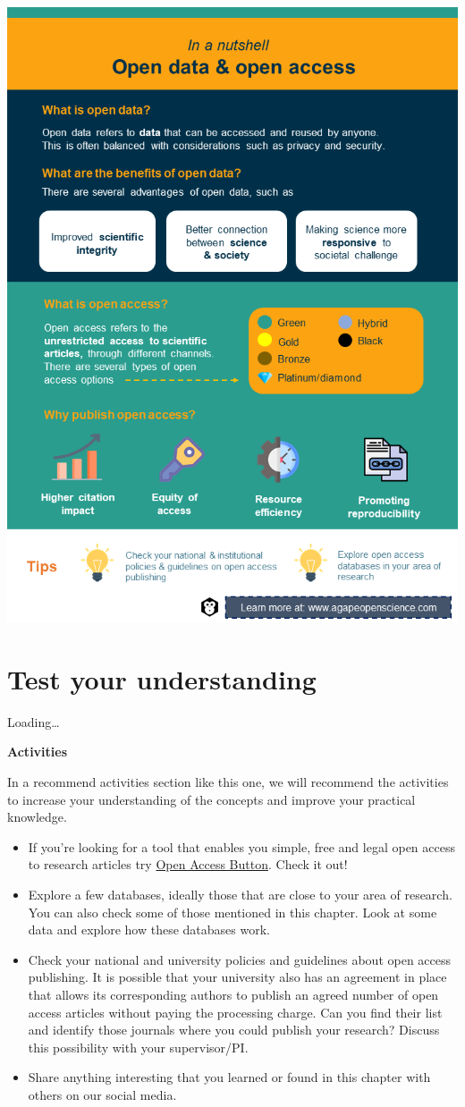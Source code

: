 \documentclass[
]{book}
\begin{document}
\begin{center}\includegraphics[width=0.7\linewidth]{images/slide02} \end{center}

\hypertarget{test-your-understanding-1}{%
\section{Test your understanding}\label{test-your-understanding-1}}

Loading\ldots{}

\textbf{Activities}

In a recommend activities section like this one, we will recommend the activities to increase your understanding of the concepts and improve your practical knowledge.

\begin{itemize}
\item
  If you're looking for a tool that enables you simple, free and legal open access to research articles try \href{https://openaccessbutton.org/}{Open Access Button}. Check it out!
\item
  Explore a few databases, ideally those that are close to your area of research. You can also check some of those mentioned in this chapter. Look at some data and explore how these databases work.
\item
  Check your national and university policies and guidelines about open access publishing. It is possible that your university also has an agreement in place that allows its corresponding authors to publish an agreed number of open access articles without paying the processing charge. Can you find their list and identify those journals where you could publish your research? Discuss this possibility with your supervisor/PI.
\item
  Share anything interesting that you learned or found in this chapter with others on our social media.
\end{itemize}
\end{document}
